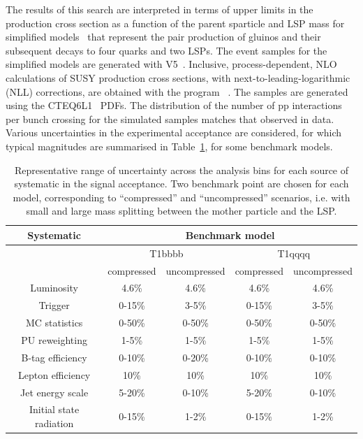 The results of this search are interpreted in terms of upper limits in
the production cross section as a function of the parent sparticle and
LSP mass for simplified models~\cite{Alwall:2008ag, Alwall:2008va,
  sms} that represent the pair production of gluinos and their
subsequent decays to four quarks and two LSPs. The event samples for
the simplified models are generated with \MADGRAPH V5~\cite{madgraph}.
Inclusive, process-dependent, NLO calculations of SUSY production
cross sections, with next-to-leading-logarithmic (NLL) corrections,
are obtained with the program \PROSPINO~\cite{Beenakker:1996ch,
  PhysRevD.80.095004,PhysRevLett.102.111802, PhysRevD.80.095004,
  1126-6708-2009-12-041, doi:10.1142/S0217751X11053560,
  susy-nlo-nll}. The samples are generated using the
CTEQ6L1~\cite{Pumplin:2002vw} PDFs. The distribution of the number of
pp interactions per bunch crossing for the simulated samples matches
that observed in data. Various uncertainties in the experimental
acceptance are considered, for which typical magnitudes are summarised
in Table~\ref{tab:signal_systs}, for some benchmark models. 

\begin{table}[h!]
  \caption{Representative range of uncertainty across the analysis bins 
    for each source of systematic in the signal acceptance. 
    Two benchmark point are chosen for each model, 
    corresponding to ``compressed'' and ``uncompressed'' scenarios, 
    i.e. with small and large mass splitting between the mother particle and the LSP.
  }
  \label{tab:signal_systs}
  \centering
  \begin{tabular}{ ccccc }
    \hline
    \hline
    Systematic & \multicolumn{4}{c}{Benchmark model} \\
    \hline
    & \multicolumn{2}{c}{T1bbbb} & \multicolumn{2}{c}{T1qqqq} \\ 
    & compressed & uncompressed & compressed & uncompressed \\
    \hline
    Luminosity               & 4.6\%      & 4.6\%      & 4.6\%     & 4.6\%      \\ \hline
    Trigger                  & 0-15\%     & 3-5\%      & 0-15\%    & 3-5\%      \\ \hline
    MC statistics            & 0-50\%     & 0-50\%     & 0-50\%    & 0-50\%     \\ \hline
    PU reweighting           & 1-5\%      & 1-5\%      & 1-5\%     & 1-5\%      \\ \hline
    B-tag efficiency         & 0-10\%     & 0-20\%     & 0-10\%    & 0-10\%     \\ \hline
    Lepton efficiency        & 10\%       & 10\%       & 10\%      & 10\%       \\ \hline
    Jet energy scale         & 5-20\%     & 0-10\%     & 5-20\%    & 0-10\%     \\ \hline
    Initial state radiation  & 0-15\%     & 1-2\%      & 0-15\%    & 1-2\%      \\
    \hline
    \hline
  \end{tabular}
\end{table}

